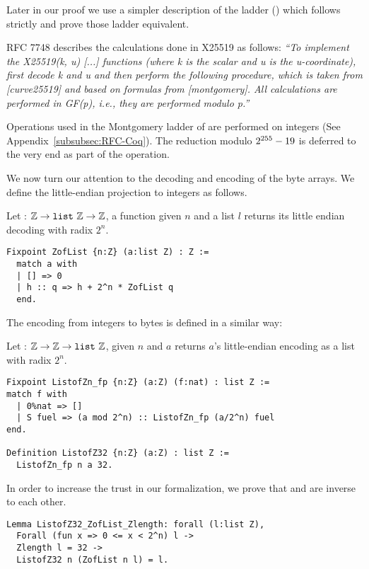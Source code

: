 Later in our proof we use a simpler description of the ladder
() which follows strictly 
and prove those ladder equivalent.

RFC 7748 describes the calculations done in X25519 as follows:
\emph{``To implement the X25519(k, u) [...] functions (where k is
  the scalar and u is the u-coordinate), first decode k and u and then
  perform the following procedure, which is taken from [curve25519] and
  based on formulas from [montgomery].  All calculations are performed
  in GF(p), i.e., they are performed modulo p.''}~\cite{rfc7748}

Operations used in the Montgomery ladder of  are performed on
integers (See Appendix~\ref{subsubsec:RFC-Coq}).
The reduction modulo $2^{255}-19$ is deferred to the very end as part of the
 operation.

We now turn our attention to the decoding and encoding of the byte arrays.
We define the little-endian projection to integers as follows.
\begin{dfn}
  Let  : $\mathbb{Z} \rightarrow \texttt{list}~\mathbb{Z} \rightarrow \mathbb{Z}$,
  a function given $n$ and a list $l$ returns its little endian decoding with radix $2^n$.
\end{dfn}
\begin{lstlisting}[language=Coq,aboveskip=0pt,belowskip=1pt]
Fixpoint ZofList {n:Z} (a:list Z) : Z :=
  match a with
  | [] => 0
  | h :: q => h + 2^n * ZofList q
  end.
\end{lstlisting}
The encoding from integers to bytes is defined in a similar way:
\begin{dfn}
  Let  : $\mathbb{Z} \rightarrow \mathbb{Z} \rightarrow \texttt{list}~\mathbb{Z}$, given
  $n$ and $a$ returns $a$'s little-endian encoding as a list with radix $2^n$.
\end{dfn}
\begin{lstlisting}[language=Coq,aboveskip=0pt,belowskip=1pt]
Fixpoint ListofZn_fp {n:Z} (a:Z) (f:nat) : list Z :=
match f with
  | 0%nat => []
  | S fuel => (a mod 2^n) :: ListofZn_fp (a/2^n) fuel
end.

Definition ListofZ32 {n:Z} (a:Z) : list Z :=
  ListofZn_fp n a 32.
\end{lstlisting}
In order to increase the trust in our formalization, we prove that
 and  are inverse to each other.
\begin{lstlisting}[language=Coq,aboveskip=0pt,belowskip=1pt]
Lemma ListofZ32_ZofList_Zlength: forall (l:list Z),
  Forall (fun x => 0 <= x < 2^n) l ->
  Zlength l = 32 ->
  ListofZ32 n (ZofList n l) = l.
\end{lstlisting}

